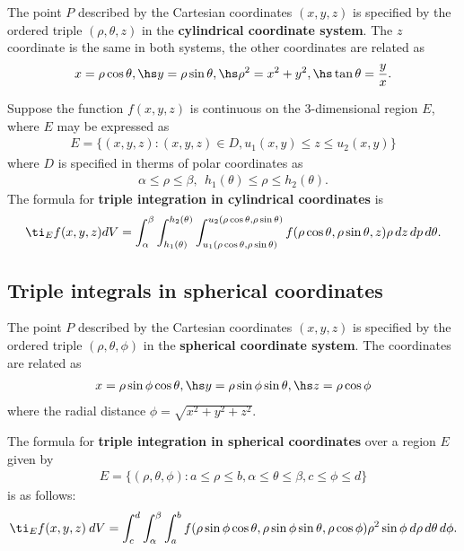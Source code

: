 \documentclass{article}
\begin{document}
\begin{definition}
    The point $P$ described by the Cartesian coordinates $(x,y,z)$ is specified by the
    ordered triple $(\rho,\theta,z)$ in the \textbf{cylindrical coordinate system}. The
    $z$ coordinate is the same in both systems, the other coordinates are related as
    \begin{align*}
        x=\rho\cos\theta,\hs y=\rho\sin\theta,\hs
        \rho^2 = x^2+y^2,\hs\tan\theta = \frac{y}{x}.
    \end{align*}
\end{definition}
\begin{theorem}
    Suppose the function $f(x,y,z)$ is continuous on the 3-dimensional region $E$, where $E$
    may be expressed as
    \begin{align*}
        E=\{(x,y,z) : (x,y,z) \in D, u_1(x,y) \leq z \leq u_2(x,y)\}
    \end{align*}
    where $D$ is specified in therms of polar coordinates as
    \begin{align*}
        \alpha \leq \rho \leq \beta,\:\: h_1(\theta) \leq \rho \leq h_2(\theta).
    \end{align*}
    The formula for \textbf{triple integration in cylindrical coordinates} is
    \begin{align*}
        \ti_E f(x,y,z) dV = \int_\alpha^\beta \int_{h_1(\theta)}^{h_2(\theta)}
        \int_{u_1(\rho\cos\theta,\rho\sin\theta)}^{u_2(\rho\cos\theta,\rho\sin\theta)}
        f(\rho\cos\theta,\rho\sin\theta,z)\rho\,dz\,dp\,d\theta.
    \end{align*}
\end{theorem}


\subsection{Triple integrals in spherical coordinates}


\begin{definition}
    The point $P$ described by the Cartesian coordinates $(x,y,z)$ is specified by the ordered
    triple $(\rho,\theta,\phi)$ in the \textbf{spherical coordinate system}. The coordinates are
    related as
    \begin{align*}
        x=\rho\sin\phi\cos\theta,\hs y = \rho \sin\phi\sin\theta,\hs z = \rho\cos\phi
    \end{align*}
    where the radial distance $\phi=\sqrt{x^2+y^2+z^2}$.
\end{definition}
\begin{theorem}
    The formula for \textbf{triple integration in spherical coordinates} over a region $E$
    given by
    \begin{align*}
        E=\{(\rho,\theta,\phi):a\leq\rho\leq b,\alpha\leq\theta\leq\beta, c\leq\phi\leq d\}
    \end{align*}
    is as follows:
    \begin{align*}
        \ti_E f(x,y,z)\:dV = \int_c^d \int_\alpha^\beta \int_a^b f(\rho\sin\phi\cos\theta,\rho\sin\phi\sin\theta,\rho\cos\phi)\rho^2\sin\phi\:d\rho\,d\theta\,d\phi.
    \end{align*}
\end{theorem}
\end{document}
